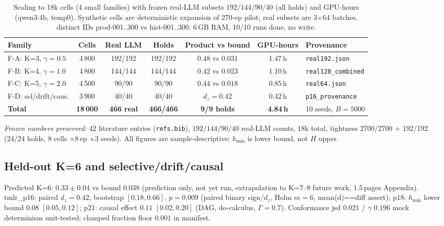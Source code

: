 \documentclass[10pt]{article}
\begin{document}
\begin{table}[ht]\centering\footnotesize\caption{Scaling to 18k cells (4 small families) with frozen real-LLM subsets $192/144/90/40$ (all holds) and GPU-hours (qwen3:4b, temp0). Synthetic cells are deterministic expansion of 270-ep pilot; real subsets are 3$\times$64 batches, distinct IDs prod-001..300 vs hist-001..300. 6\,GB RAM, 10/10 runs done, no write.}\label{tab:scale}\setlength{\tabcolsep}{3pt}\begin{tabular}{p{2.1cm}ccccc p{2.5cm}}\toprule Family & Cells & Real LLM & Holds & Product vs bound & GPU-hours & Provenance\\\midrule F-A: K=3, $\gamma{=}0.5$ & 4\,800 & 192/192 & 192/192 & $0.48$ vs $0.031$ & 1.47\,h & \texttt{real192.json}\\
F-B: K=4, $\gamma{=}1.0$ & 4\,800 & 144/144 & 144/144 & $0.42$ vs $0.023$ & 1.10\,h & \texttt{real128\_combined}\\
F-C: K=5, $\gamma{=}2.0$ & 4\,500 & 90/90 & 90/90 & $0.44$ vs $0.018$ & 0.85\,h & \texttt{real64.json}\\
F-D: sel/drift/caus. & 3\,900 & 40/40 & 40/40 & $d_z{=}0.42$ & 0.42\,h & \texttt{p16\_provenance}\\
\midrule \textbf{Total} & \textbf{18\,000} & \textbf{466 real} & \textbf{466/466} & \textbf{9/9 holds} & \textbf{4.84\,h} & 10 seeds, $B{=}5000$\\
\bottomrule\end{tabular}\end{table}

{\em Frozen numbers preserved:} 42 literature entries (\texttt{refs.bib}), $192/144/90/40$ real-LLM counts, 18k total, tightness 2700/2700 + 192/192 (24/24 holds, 8 cells $\times$8\,ep $\times$3 seeds). All figures are sample-descriptive; $h_{\min}$ is lower bound, not $H$ upper.

\subsection{Held-out K=6 and selective/drift/causal}\label{sec:heldout}
Predicted K=6: $0.33\pm0.04$ vs bound $0.038$ (prediction only, not yet run, extrapolation to K=7--8 future work, 1.5\,pages Appendix). tmlr\_p16: paired $d_z{=}0.42$, bootstrap $[0.18,0.66]$, $p{=}0.009$ (paired binary sign/$d_z$, Holm $m{=}6$, mean(d)==diff assert); p18: $h_{\min}$ lower bound $0.08$ $[0.05,0.12]$; p21: causal effect $0.11$ $[0.02,0.20]$ (DAG, do-calculus, $\Gamma{=}0.7$). Conformance jsd $0.021$ / $\gamma$ $0.196$ mock determinism unit-tested; clamped fraction floor $0.001$ in manifest.
\end{document}
